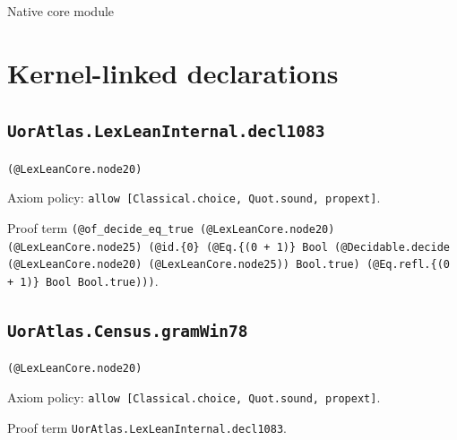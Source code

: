 \documentclass[11pt]{article}
\begin{document}
\begin{center}{\LARGE Native core module}\end{center}
\section*{Kernel-linked declarations}
\subsection*{\texttt{UorAtlas.LexLeanInternal.decl1083}}
\noindent\texttt{(@LexLeanCore.node20)}\par
\noindent Axiom policy: \texttt{allow [Classical.choice, Quot.sound, propext]}.\par
\noindent Proof term \texttt{(@of\_decide\_eq\_true (@LexLeanCore.node20) (@LexLeanCore.node25) (@id.\{0\} (@Eq.\{(0 + 1)\} Bool (@Decidable.decide (@LexLeanCore.node20) (@LexLeanCore.node25)) Bool.true) (@Eq.refl.\{(0 + 1)\} Bool Bool.true)))}.\par
\subsection*{\texttt{UorAtlas.Census.gramWin78}}
\noindent\texttt{(@LexLeanCore.node20)}\par
\noindent Axiom policy: \texttt{allow [Classical.choice, Quot.sound, propext]}.\par
\noindent Proof term \texttt{UorAtlas.LexLeanInternal.decl1083}.\par
\end{document}
